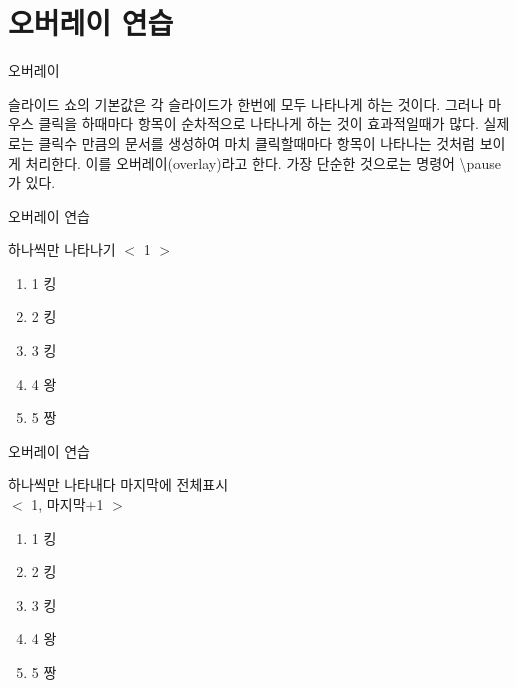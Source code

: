 \documentclass[10pt,blue,xcolor=pdftex,dvipsnames,table,handout]{beamer}
\begin{document}
		\section{오버레이 연습} 




		\begin{frame}[t]{오버레이}

		슬라이드 쇼의 기본값은 각 슬라이드가 한번에 모두 나타나게 하는 것이다.
		그러나 마우스 클릭을 하때마다 항목이 순차적으로 나타나게 하는 것이 효과적일때가 많다.
		실제로는 클릭수 만큼의 문서를 생성하여 마치 클릭할때마다 항목이 나타나는 것처럼 보이게 처리한다. 
		이를 오버레이(overlay)라고 한다. 가장 단순한 것으로는 명령어 \textbackslash pause가 있다.


		\end{frame}

		\begin{frame}[t]{오버레이 연습}

			\begin{block} {하나씩만 나타나기 $<$ 1 $>$ }
			\begin{enumerate}
			\item <1> 1 킹
			\item <2> 2 킹
			\item <3> 3 킹
			\item <4> 4 왕
			\item <5> 5 짱
			\end{enumerate}
			\end{block} 

		\end{frame}

		\begin{frame}[t]{오버레이 연습}

			\begin{block} {하나씩만 나타내다 마지막에 전체표시\\
						$<$ 1, 마지막+1 $>$ }
			\begin{enumerate}
			\item <1,6> 1 킹
			\item <2,6> 2 킹
			\item <3,6> 3 킹
			\item <4,6> 4 왕
			\item <5,6> 5 짱
			\end{enumerate}
			\end{block} 

		\end{frame}
\end{document}
